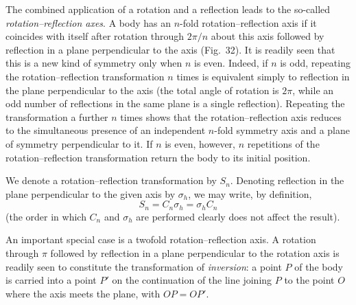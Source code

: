 The combined application of a rotation and a reflection leads to the so-called \emph{rotation--reflection axes}. A body has an $n$-fold rotation--reflection axis if it coincides with itself after rotation through $2\pi/n$ about this axis followed by reflection in a plane perpendicular to the axis (Fig.~32). It is readily seen that this is a new kind of symmetry only when $n$ is even. Indeed, if $n$ is odd, repeating the rotation--reflection transformation $n$ times is equivalent simply to reflection in the plane perpendicular to the axis (the total angle of rotation is $2\pi$, while an odd number of reflections in the same plane is a single reflection). Repeating the transformation a further $n$ times shows that the rotation--reflection axis reduces to the simultaneous presence of an independent $n$-fold symmetry axis and a plane of symmetry perpendicular to it. If $n$ is even, however, $n$ repetitions of the rotation--reflection transformation return the body to its initial position.

\begin{figure}[ht]
\centering
{}
\caption{}
\label{fig:91-32}
\end{figure}

We denote a rotation--reflection transformation by $S_n$. Denoting reflection in the plane perpendicular to the given axis by $\sigma_h$, we may write, by definition,
\begin{equation}
S_n=C_n\sigma_h=\sigma_hC_n
\tag{91.4}
\end{equation}
(the order in which $C_n$ and $\sigma_h$ are performed clearly does not affect the result).

An important special case is a twofold rotation--reflection axis. A rotation through $\pi$ followed by reflection in a plane perpendicular to the rotation axis is readily seen to constitute the transformation of \emph{inversion}: a point $P$ of the body is carried into a point $P'$ on the continuation of the line joining $P$ to the point $O$ where the axis meets the plane, with $OP=OP'$.

